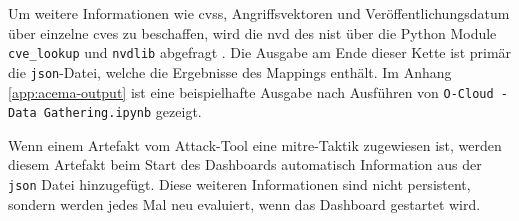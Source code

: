 \par Um weitere Informationen wie \gls{cvss}, Angriffsvektoren und Veröffentlichungsdatum über einzelne \glspl{cve} zu beschaffen, wird die \gls{nvd} des \gls{nist} über die Python Module \verb|cve_lookup| und \verb|nvdlib| abgefragt \autocite{NVDLibNVDLibNIST} \autocite{MachineThingCve_lookupLook} \autocite{NVDHome}. Die Ausgabe am Ende dieser Kette ist primär die \verb|json|-Datei, welche die Ergebnisse des Mappings enthält. Im Anhang \ref{app:acema-output} ist eine beispielhafte Ausgabe nach Ausführen von \verb|O-Cloud - Data Gathering.ipynb| gezeigt.
\par Wenn einem Artefakt vom Attack-Tool eine \gls{mitre}-Taktik zugewiesen ist, werden diesem Artefakt beim Start des Dashboards automatisch Information aus der \verb|json| Datei hinzugefügt. Diese weiteren Informationen sind nicht persistent, sondern werden jedes Mal neu evaluiert, wenn das Dashboard gestartet wird.
